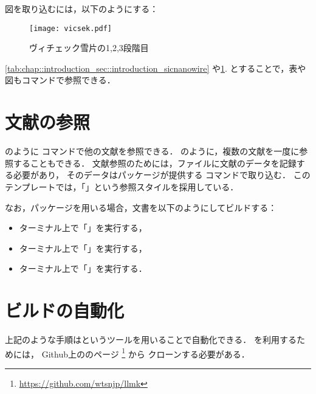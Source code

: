 図を取り込むには，以下のようにする：
\begin{figure}[htbp]
    \centering
    \texttt{[image: vicsek.pdf]}
    \caption{ヴィチェック雪片の1,2,3段階目}
    \label{fig:chap::introduction_sec::introduction_vicseksnowflake}
\end{figure}

\cref{tab:chap::introduction_sec::introduction_sicnanowire}
や\cref{fig:chap::introduction_sec::introduction_vicseksnowflake}.
とすることで，表や図もコマンドで参照できる．

\section{文献の参照} \label{sec:chap::introduction_citation}

\cite{10.1093/jmicro/dfaa015}のように
コマンドで他の文献を参照できる．
\cite{10.1093/jmicro/dfaa015,Hayashi:2020:1533-4880:3038,Ishida_2019,doi:10.1063/1.4894003}
のように，複数の文献を一度に参照することもできる．
文献参照のためには，ファイルに文献のデータを記録する必要があり，
そのデータはパッケージが提供する
コマンドで取り込む．
このテンプレートでは，「」という参照スタイルを採用している．

なお，パッケージを用いる場合，文書を以下のようにしてビルドする：
\begin{itemize}
    \item ターミナル上で「」を実行する，
    \item ターミナル上で「」を実行する，
    \item ターミナル上で「」を実行する．
\end{itemize}

\section{ビルドの自動化} \label{sec:chap::introduction_autobuild}

上記のような手順はというツールを用いることで自動化できる．
を利用するためには，
Github上ののページ%
\footnote{\url{https://github.com/wtsnjp/llmk}}%
から
クローンする必要がある．